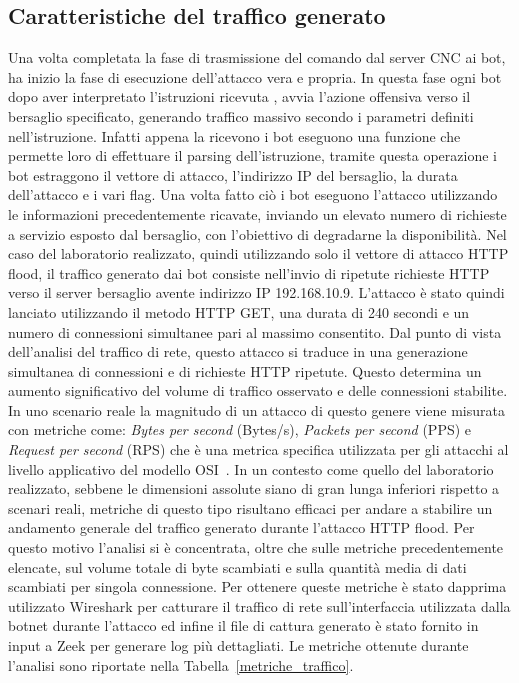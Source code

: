 \subsection{Caratteristiche del traffico generato}
Una volta completata la fase di trasmissione del comando dal server CNC ai bot, ha inizio la fase di esecuzione dell'attacco vera e propria. In questa fase ogni bot dopo aver interpretato l'istruzioni ricevuta , avvia l'azione offensiva verso il bersaglio specificato, generando traffico massivo secondo i parametri definiti nell'istruzione. Infatti appena la ricevono i bot eseguono una funzione che permette loro di effettuare il parsing dell'istruzione, tramite questa operazione i bot estraggono il vettore di attacco, l'indirizzo IP del bersaglio, la durata dell'attacco e i vari flag. Una volta fatto ciò i bot eseguono l'attacco utilizzando le informazioni precedentemente ricavate, inviando un elevato numero di richieste a servizio esposto dal bersaglio, con l'obiettivo di degradarne la disponibilità. Nel caso del laboratorio realizzato, quindi utilizzando solo il vettore di attacco  HTTP flood, il traffico generato dai bot consiste nell'invio di ripetute richieste HTTP verso il server bersaglio avente indirizzo IP 192.168.10.9. L'attacco è stato quindi lanciato utilizzando il metodo HTTP GET, una durata di 240 secondi e un numero di connessioni simultanee pari al massimo consentito. Dal punto di vista dell'analisi del traffico di rete, questo attacco si traduce in una generazione simultanea di connessioni e di richieste HTTP ripetute. Questo determina un aumento significativo del volume di traffico osservato e delle connessioni stabilite. In uno scenario reale la magnitudo di un attacco di questo genere viene misurata con metriche come: \emph{Bytes per second} (Bytes/s), \emph{Packets per second} (PPS) e \emph{Request per second} (RPS) che è una metrica specifica utilizzata per gli attacchi al livello applicativo del modello OSI~\cite{metriche_DDoS}. In un contesto come quello del laboratorio realizzato, sebbene le dimensioni assolute siano di gran lunga inferiori rispetto a scenari reali, metriche di questo tipo risultano efficaci per andare a stabilire un andamento generale del traffico generato durante l'attacco HTTP flood. Per questo motivo l'analisi si è concentrata, oltre che sulle metriche precedentemente elencate, sul volume totale di byte scambiati e sulla quantità media di dati scambiati per singola connessione. Per ottenere queste metriche è stato dapprima utilizzato Wireshark per catturare il traffico di rete sull'interfaccia utilizzata dalla botnet durante l'attacco ed infine il file di cattura generato è stato fornito in input a Zeek per generare log più dettagliati. Le metriche ottenute durante l'analisi sono riportate nella Tabella~\ref{metriche_traffico}.
